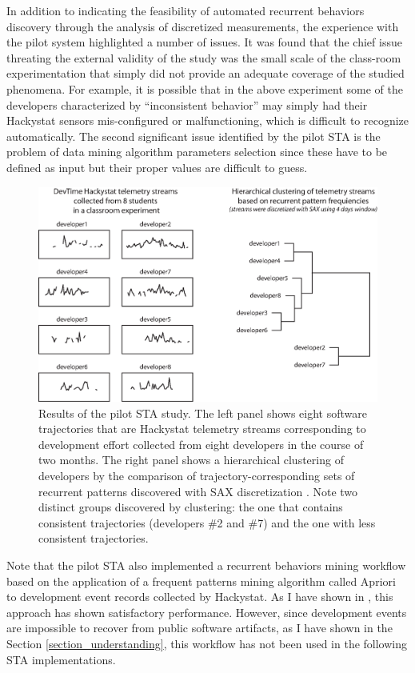 In addition to indicating the feasibility of automated recurrent behaviors discovery through the analysis of discretized 
measurements, the experience with the pilot system highlighted a number of issues.
It was found that the chief issue threating the external validity of the study was the small scale of the class-room 
experimentation that simply did not provide an adequate coverage of the studied phenomena. 
For example, it is possible that in the above experiment some of the developers characterized by ``inconsistent 
behavior'' may simply had their Hackystat sensors mis-configured or malfunctioning, which is difficult to recognize automatically.
The second significant issue identified by the pilot STA is the problem of data mining algorithm parameters 
selection since these have to be defined as input but their proper values are difficult to guess.

\begin{figure}[t]
   \centering
   \includegraphics[width=145mm]{figures/STA1.eps}
   \caption{Results of the pilot STA study. 
   The left panel shows eight software trajectories that are Hackystat telemetry streams 
   corresponding to development effort \cite{citeulike:557296} collected from eight developers in the course of two months.
   The right panel shows a hierarchical clustering of developers by the comparison of trajectory-corresponding sets of 
   recurrent patterns discovered with SAX discretization \cite{sax}. 
   Note two distinct groups discovered by clustering: the one that contains consistent trajectories (developers \#2 and \#7) 
   and the one with less consistent trajectories.}
   \label{fig:STA1-results}
\end{figure}

Note that the pilot STA also implemented a recurrent behaviors mining workflow based on the application of 
a frequent patterns mining algorithm called Apriori \cite{citeulike:775528} to development event records collected 
by Hackystat. As I have shown in \cite{citeulike:13159603}, this approach has shown satisfactory performance. 
However, since development events are impossible to recover from public software artifacts, 
as I have shown in the Section \ref{section_understanding}, this workflow has not been used in the following STA 
implementations.

